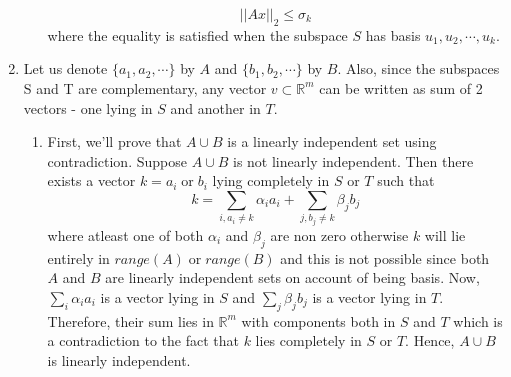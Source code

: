 \documentclass{article}
\begin{document}
\begin{enumerate}
\begin{enumerate}[label=(\alph*)]
        $$||Ax||_2 \leq \sigma_k$$ where the equality is satisfied when the subspace $S$ has basis $u_1, u_2, \cdots, u_k$.
    \end{enumerate}
    \clearpage
    \item Let us denote $\{a_1, a_2, \cdots\}$ by $A$ and $\{b_1, b_2, \cdots\}$ by $B$. Also, since the subspaces S and T are complementary, any vector $v \subset \mathbb{R}^m$ can be written as sum of 2 vectors - one lying in $S$ and another in $T$.
    \begin{enumerate}[label=(\alph*)]
        \item First, we'll prove that $A \cup B$ is a linearly independent set using contradiction. Suppose $A \cup B$ is not linearly independent. Then there exists a vector $k = a_i \; \textrm{or} \; b_i$ lying completely in $S$ or $T$ such that
        $$k = \sum_{i, a_i \neq k} \alpha_ia_i + \sum_{j, b_j \neq k} \beta_jb_j$$
        where atleast one of both $\alpha_i$ and $\beta_j$ are non zero otherwise $k$ will lie entirely in $range(A) \; \textrm{or} \; range(B)$ and this is not possible since both $A$ and $B$ are linearly independent sets on account of being basis. Now, $\sum_i\alpha_ia_i$ is a vector lying in $S$ and $\sum_j\beta_jb_j$ is a vector lying in $T$. Therefore, their sum lies in $\mathbb{R}^m$ with components both in $S$ and $T$ which is a contradiction to the fact that $k$ lies completely in $S$ or $T$. Hence, $A \cup B$ is linearly independent.


\end{enumerate}
\end{enumerate}
\end{document}
